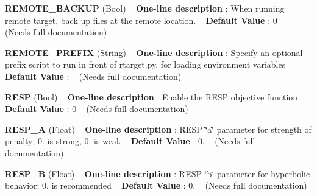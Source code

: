 \begin{DoxyItemize}
\item {\bfseries  R\+E\+M\+O\+T\+E\+\_\+\+B\+A\+C\+K\+UP } (Bool) ~\newline
{\bfseries  One-\/line description }\+: When running remote target, back up files at the remote location. ~\newline
{\bfseries  Default Value }\+: 0 ~\newline
(Needs full documentation)\end{DoxyItemize}
\begin{DoxyItemize}
\item {\bfseries  R\+E\+M\+O\+T\+E\+\_\+\+P\+R\+E\+F\+IX } (String) ~\newline
{\bfseries  One-\/line description }\+: Specify an optional prefix script to run in front of rtarget.\+py, for loading environment variables ~\newline
{\bfseries  Default Value }\+: ~\newline
(Needs full documentation)\end{DoxyItemize}
\begin{DoxyItemize}
\item {\bfseries  R\+E\+SP } (Bool) ~\newline
{\bfseries  One-\/line description }\+: Enable the R\+E\+SP objective function ~\newline
{\bfseries  Default Value }\+: 0 ~\newline
(Needs full documentation)\end{DoxyItemize}
\begin{DoxyItemize}
\item {\bfseries  R\+E\+S\+P\+\_\+A } (Float) ~\newline
{\bfseries  One-\/line description }\+: R\+E\+SP \char`\"{}a\char`\"{} parameter for strength of penalty; 0. is strong, 0. is weak ~\newline
{\bfseries  Default Value }\+: 0. ~\newline
(Needs full documentation)\end{DoxyItemize}
\begin{DoxyItemize}
\item {\bfseries  R\+E\+S\+P\+\_\+B } (Float) ~\newline
{\bfseries  One-\/line description }\+: R\+E\+SP \char`\"{}b\char`\"{} parameter for hyperbolic behavior; 0. is recommended ~\newline
{\bfseries  Default Value }\+: 0. ~\newline
(Needs full documentation)\end{DoxyItemize}
